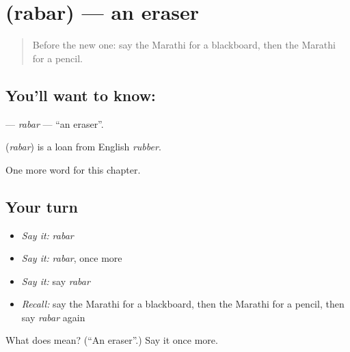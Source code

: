 \section[\texorpdfstring{\mr{रबर} (rabar)}{रबर (rabar)}]{ (rabar) — an eraser}

\label{lesson:MR-C134-rabar}



\begin{quote}
Before the new one: say the Marathi for a blackboard, then the Marathi for a pencil.
\end{quote}

\subsection*{You'll want to know: }
\textbf{} — \emph{rabar} — \textquotedblleft{}an eraser\textquotedblright{}.

\begin{cousinweb}
\textbf{} (\emph{rabar}) is a loan from English \emph{rubber}.
\end{cousinweb}

\begin{grammarlens}[title={What you've built}]
One more word for this chapter.
\end{grammarlens}

\subsection*{Your turn}
\begin{itemize}
\raggedright
  \item \emph{Say it:} \emph{rabar}
  \item \emph{Say it:} \emph{rabar}, once more
  \item \emph{Say it:} say \emph{rabar}
  \item \emph{Recall:} say the Marathi for a blackboard, then the Marathi for a pencil, then say \emph{rabar} again
\end{itemize}

\begin{tcolorbox}[breakable,colback=teal!4,colframe=teal!35!black,title={Before you move on}]
What does  mean? (\textquotedblleft{}An eraser\textquotedblright{}.) Say it once more.
\end{tcolorbox}
